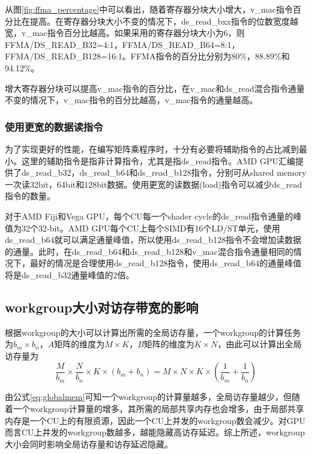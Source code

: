从图\ref{fig:ffma_percentage}中可以看出，随着寄存器分块大小增大，v\_mac指令百分比在提高。在寄存器分块大小不变的情况下，ds\_read\_bxx指令的位数宽度越宽，v\_mac指令百分比越高。如果采用的寄存器分块大小为6，则FFMA/DS\_READ\_B32=4:1，FFMA/DS\_READ\_B64=8:1，FFMA/DS\_READ\_B128=16:1。FFMA指令的百分比分别为80\%，88.89\%和94.12\%。

增大寄存器分块可以提高v\_mac指令的百分比，在v\_mac和ds\_read混合指令通量不变的情况下，v\_mac指令的百分比越高，v\_mac指令的通量越高。

\subsubsection{使用更宽的数据读指令}
为了实现更好的性能，在编写矩阵乘程序时，十分有必要将辅助指令的占比减到最小。这里的辅助指令是指非计算指令，尤其是指ds\_read指令。AMD GPU汇编提供了ds\_read\_b32，ds\_read\_b64和ds\_read\_b128指令，分别可从shared memory一次读32bit，64bit和128bit数据。使用更宽的读数据(load)指令可以减少ds\_read指令的数量。

对于AMD Fiji和Vega GPU，每个CU每一个shader cycle的ds\_read指令通量的峰值为32个32-bit。AMD GPU每个CU上每个SIMD有16个LD/ST单元，使用ds\_read\_b64就可以满足通量峰值，所以使用ds\_read\_b128指令不会增加读数据的通量。此时，在ds\_read\_b64和ds\_read\_b128和v\_mac混合指令通量相同的情况下，最好的情况是合理使用ds\_read\_b128指令，使用ds\_read\_b64的通量峰值将是ds\_read\_b32通量峰值的2倍。


\subsection{workgroup大小对访存带宽的影响}
根据workgroup的大小可以计算出所需的全局访存量，一个workgroup的计算任务为$b_m \times b_n$，$A$矩阵的维度为$M \times K$，$B$矩阵的维度为$K \times N$，由此可以计算出全局访存量为
\begin{equation}
\label{eq:globalmem}
\frac{M}{b_m} \times \frac{N}{b_n} \times K \times (b_m + b_n) = M \times N \times K \times (\frac{1}{b_m} + \frac{1}{b_n})
\end{equation}

由公式\ref{eq:globalmem}可知一个workgroup的计算量越多，全局访存量越少，但随着一个workgroup计算量的增多，其所需的局部共享内存也会增多，由于局部共享内存是一个CU上的有限资源，因此一个CU上并发的workgroup数会减少。对GPU而言CU上并发的workgroup数越多，越能隐藏高访存延迟。综上所述，workgroup大小会同时影响全局访存量和访存延迟隐藏。

